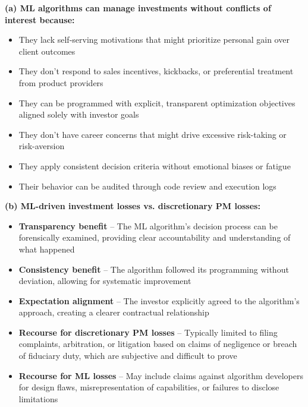 \documentclass{article}
\begin{document}
\begin{sloppypar}
\textbf{(a) ML algorithms can manage investments without conflicts of interest because:}
\begin{itemize}
    \item They lack self-serving motivations that might prioritize personal gain over client outcomes
    \item They don't respond to sales incentives, kickbacks, or preferential treatment from product providers
    \item They can be programmed with explicit, transparent optimization objectives aligned solely with investor goals
    \item They don't have career concerns that might drive excessive risk-taking or risk-aversion
    \item They apply consistent decision criteria without emotional biases or fatigue
    \item Their behavior can be audited through code review and execution logs
\end{itemize}

\textbf{(b) ML-driven investment losses vs. discretionary PM losses:}
\begin{itemize}
    \item \textbf{Transparency benefit} -- The ML algorithm's decision process can be forensically examined, providing clear accountability and understanding of what happened
    \item \textbf{Consistency benefit} -- The algorithm followed its programming without deviation, allowing for systematic improvement
    \item \textbf{Expectation alignment} -- The investor explicitly agreed to the algorithm's approach, creating a clearer contractual relationship
    \item \textbf{Recourse for discretionary PM losses} -- Typically limited to filing complaints, arbitration, or litigation based on claims of negligence or breach of fiduciary duty, which are subjective and difficult to prove
    \item \textbf{Recourse for ML losses} -- May include claims against algorithm developers for design flaws, misrepresentation of capabilities, or failures to disclose limitations
\end{itemize}


\end{sloppypar}
\end{document}
